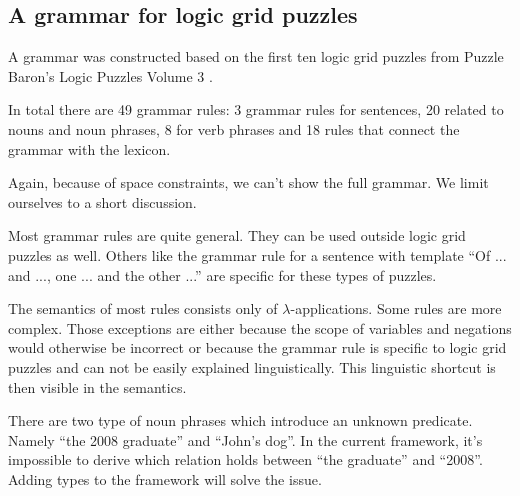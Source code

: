 \subsection{A grammar for logic grid puzzles}
A grammar was constructed based on the first ten logic grid puzzles from Puzzle Baron's Logic Puzzles Volume 3 \cite{logigrammen}.

In total there are 49 grammar rules: 3 grammar rules for sentences, 20 related to nouns and noun phrases, 8 for verb phrases and 18 rules that connect the grammar with the lexicon.

Again, because of space constraints, we can't show the full grammar. We limit ourselves to a short discussion.

Most grammar rules are quite general. They can be used outside logic grid puzzles as well. Others like the grammar rule for a sentence with template ``Of ... and ..., one ... and the other ...'' are specific for these types of puzzles.

The semantics of most rules consists only of $\lambda$-applications. Some rules are more complex. Those exceptions are either because the scope of variables and negations would otherwise be incorrect or because the grammar rule is specific to logic grid puzzles and can not be easily explained linguistically. This linguistic shortcut is then visible in the semantics.

There are two type of noun phrases which introduce an unknown predicate. Namely ``the 2008 graduate'' and ``John's dog''. In the current framework, it's impossible to derive which relation holds between ``the graduate'' and ``2008''. Adding types to the framework will solve the issue.
